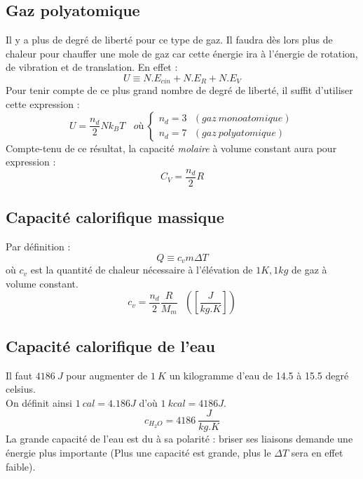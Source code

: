 \documentclass	[11pt, a4paper, openany]{book}
\begin{document}
\subsection{Gaz polyatomique}
Il y a plus de degré de liberté pour ce type de gaz. Il faudra dès lors plus de chaleur pour chauffer une mole de gaz car cette énergie ira à l'énergie de rotation, de vibration et de translation. En effet :
\begin{equation}
U \equiv N.E_{cin} + N.E_R + N.E_V
\end{equation}
Pour tenir compte de ce plus grand nombre de degré de liberté, il suffit d'utiliser cette expression :
\begin{equation}
U = \frac{n_d}{2}Nk_BT\ \ \ \ où \ \left\{\begin{array}{l}
n_d = 3 \ \ \ (gaz\ monoatomique)\\
n_d = 7 \ \ \ (gaz\ polyatomique)
\end{array}\right.
\end{equation}
Compte-tenu de ce résultat, la capacité \textit{molaire} à volume constant aura pour expression :
\begin{equation}
C_V = \frac{n_d}{2}R
\end{equation}

\subsection{Capacité calorifique massique}
Par définition :
\begin{equation}
Q \equiv c_v m \Delta T
\end{equation}
où $c_v$ est la quantité de chaleur nécessaire à l'élévation de $1K, 1kg$ de gaz à volume constant.
\begin{equation}
c_v = \frac{n_d}{2}\frac{R}{M_m}\ \ \ \left(\left[\frac{J}{kg.K}\right]\right)
\end{equation}

\subsection{Capacité calorifique de l'eau}
Il faut $4186\ J$ pour augmenter de $1\ K$ un kilogramme d'eau de 14.5 à 15.5 degré celsius.\\
On définit ainsi $1\ cal = 4.186J$ d'où $1\ kcal = 4186J$.
\begin{equation}
c_{H_2O} = 4186\ \frac{J}{kg.K}
\end{equation}
La grande capacité de l'eau est du à sa polarité : briser ses liaisons demande une énergie plus importante (Plus une capacité est grande, plus le $\Delta T$ sera en effet faible).
\end{document}
